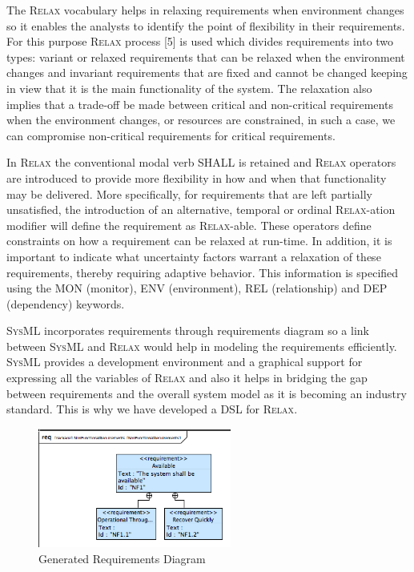 \documentclass[10pt, conference, compsocconf]{IEEEtran}
\def\myrelax{\textsc{Relax}}                  %
\def\sysml{\textsc{SysML}}
\begin{document}
The \myrelax{} vocabulary helps in relaxing requirements when environment changes so it enables the analysts to identify the point of flexibility in their requirements. For this purpose \myrelax{} process [5] is used which divides requirements into two types: variant or relaxed requirements that can be relaxed when the environment changes and invariant requirements that are fixed and cannot be changed keeping in view that it is the main functionality of the system. The relaxation also implies that a trade-off be made between critical and non-critical requirements when the environment changes, or resources are constrained, in such a case, we can compromise non-critical requirements for critical requirements. 

In \myrelax{} the conventional modal verb SHALL is retained and \myrelax{} operators are introduced to provide more flexibility in how and when that functionality may be delivered. More specifically, for requirements that are left partially unsatisfied, the introduction of an alternative, temporal or ordinal \myrelax{}-ation modifier will define the requirement as \myrelax{}-able. These operators define constraints on how a requirement can be relaxed at run-time. In addition, it is important to indicate what uncertainty factors warrant a relaxation of these requirements, thereby requiring adaptive behavior. This information is specified using the MON (monitor), ENV (environment), REL (relationship) and DEP (dependency) keywords.

\sysml{} incorporates requirements through requirements diagram so a link between \sysml{} and \myrelax{} would help in modeling the requirements efficiently. \sysml{} provides a development environment and a graphical support for expressing all the variables of \myrelax{} and also it helps in bridging the gap between requirements and the overall system model as it is becoming an industry standard. This is why we have developed a DSL for \myrelax{}.

\begin{figure}[!t]
\centering
\includegraphics[width=2.5in]{fig4}
\caption{Generated Requirements Diagram}
\label{fig:reqdiag}
\end{figure}
\end{document}
